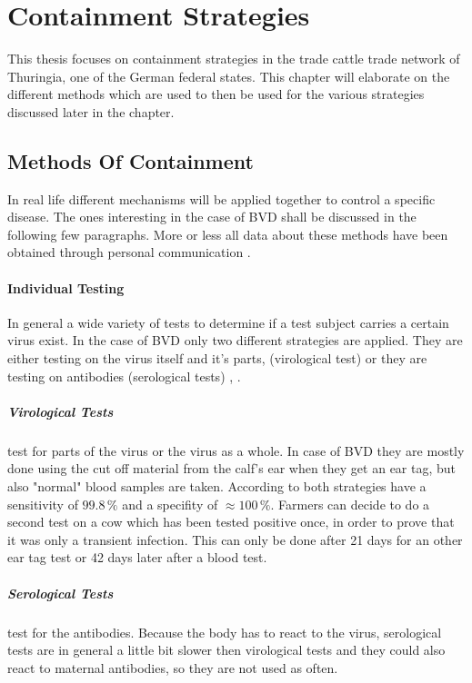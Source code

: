 \section{Containment Strategies}
This thesis focuses on containment strategies in the trade cattle trade network of Thuringia, one of the German federal states. This chapter will elaborate on the different methods which are used to then be used for the various strategies discussed later in the chapter.

\subsection{Methods Of Containment}
In real life different mechanisms will be applied together to control a specific disease. The ones interesting in the case of BVD shall be discussed in the following few paragraphs. More or less all data about these methods have been obtained through personal communication \citep{personalCom}.

\paragraph{Individual Testing}
In general a wide variety of tests to determine if a test subject carries a certain virus exist. In the case of BVD only two different strategies are applied. They are either testing on the virus itself and it's parts, (virological test) or they are testing on antibodies (serological tests) \citep{haller1999diagnostik}, \citep{personalCom}. 

\subparagraph{Virological Tests} test for parts of the virus or the virus as a whole. In case of BVD they are mostly done using the cut off material from the calf's ear when they get an ear tag, but also "normal" blood samples are taken. According to \citep{personalCom} both strategies have a sensitivity of $99.8\,\%$ and a specifity of $\approx 100\,\%$. Farmers can decide to do a second test on a cow which has been tested positive once, in order to prove that it was only a transient infection. This can only be done after 21 days for an other ear tag test or 42 days later after a blood test.

\subparagraph{Serological Tests} test for the antibodies. Because the body has to react to the virus, serological tests are in general a little bit slower then virological tests and they could also react to maternal antibodies, so they are not used as often.

